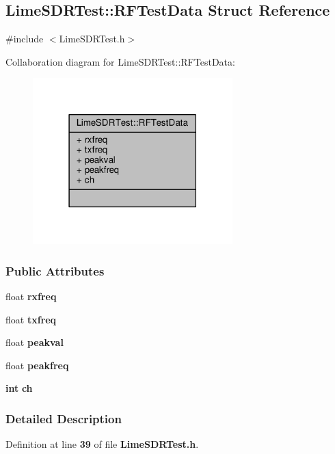 \subsection{Lime\+S\+D\+R\+Test\+:\+:R\+F\+Test\+Data Struct Reference}
\label{structLimeSDRTest_1_1RFTestData}


{\ttfamily \#include $<$Lime\+S\+D\+R\+Test.\+h$>$}



Collaboration diagram for Lime\+S\+D\+R\+Test\+:\+:R\+F\+Test\+Data\+:
\nopagebreak
\begin{figure}[H]
\begin{center}
\leavevmode
\includegraphics[width=219pt]{db/d6c/structLimeSDRTest_1_1RFTestData__coll__graph}
\end{center}
\end{figure}
\subsubsection*{Public Attributes}
\begin{DoxyCompactItemize}
\item 
float {\bf rxfreq}
\item 
float {\bf txfreq}
\item 
float {\bf peakval}
\item 
float {\bf peakfreq}
\item 
{\bf int} {\bf ch}
\end{DoxyCompactItemize}


\subsubsection{Detailed Description}


Definition at line {\bf 39} of file {\bf Lime\+S\+D\+R\+Test.\+h}.



